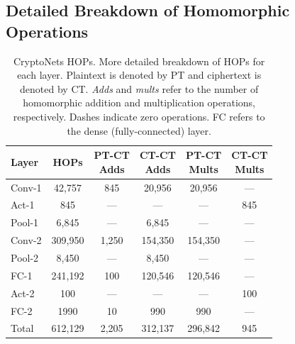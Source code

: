 \documentclass[conference]{IEEEtran}
\begin{document}
\subsection{Detailed Breakdown of Homomorphic Operations}\label{sup:hops}

\begin{table}[!htbp]
    \centering
    \small
    \begin{tabular}{@{}l|c|c|c|c|c@{}}
    \toprule
    Layer & HOPs & \pbox{20cm}{PT-CT \\ Adds} & \pbox{20cm}{CT-CT \\ Adds} & \pbox{20cm}{PT-CT \\ Mults} & \pbox{20cm}{CT-CT \\ Mults} \\ \midrule
    Conv-1 & 42,757 & 845 & 20,956 & 20,956 & --- \\
    Act-1 & 845 & --- & --- & --- & 845 \\
    Pool-1 &  6,845 & --- & 6,845 & --- & --- \\
    Conv-2 &  309,950 & 1,250 & 154,350 & 154,350 & --- \\
    Pool-2 &  8,450 & --- & 8,450 & --- & --- \\
    FC-1 &  241,192 & 100 & 120,546 & 120,546 & --- \\
    Act-2 & 100 & --- & --- & --- & 100 \\
    FC-2 & 1990 & 10 & 990 & 990 & --- \\  \midrule
    Total &  612,129 & 2,205 & 312,137 & 296,842 & 945 \\ \bottomrule
    \end{tabular}
    \caption{CryptoNets HOPs. More detailed breakdown of HOPs for each layer. Plaintext is denoted by PT and ciphertext is denoted by CT. \textit{Adds} and \textit{mults} refer to the number of homomorphic addition and multiplication operations, respectively. Dashes indicate zero operations. FC refers to the dense (fully-connected) layer.}
        \label{table:sup_hops_cryptonets}
\end{table}
\end{document}
